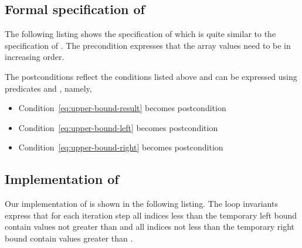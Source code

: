 \FloatBarrier

\subsection{Formal specification of \upperbound}

The following listing shows the specification of  which
is quite similar to the specification of .
The precondition  expresses
that the array values need to be in increasing order.

The postconditions reflect the conditions listed above and can be expressed
using predicates  and , namely,


\begin{itemize}
\item Condition~\eqref{eq:upper-bound-result} becomes postcondition 
\item Condition~\eqref{eq:upper-bound-left} becomes postcondition 
\item Condition~\eqref{eq:upper-bound-right} becomes postcondition 
\end{itemize}



\subsection{Implementation of \upperbound}

Our implementation of  is shown in the following listing.
The loop invariants express that for each iteration step all indices less than 
the temporary left bound  contain values not greater than 
and all indices not less than the temporary right bound  contain
values greater than .



\clearpage

